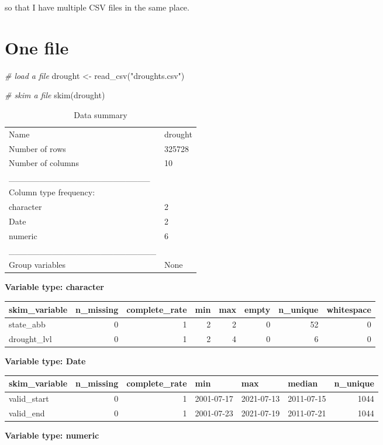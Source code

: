 \documentclass[
]{article}
\newenvironment{Shaded}{\begin{snugshade}}{\end{snugshade}}
\newcommand{\CommentTok}[1]{\textcolor[rgb]{0.56,0.35,0.01}{\textit{#1}}}
\newcommand{\FunctionTok}[1]{\textcolor[rgb]{0.00,0.00,0.00}{#1}}
\newcommand{\NormalTok}[1]{#1}
\newcommand{\OtherTok}[1]{\textcolor[rgb]{0.56,0.35,0.01}{#1}}
\newcommand{\StringTok}[1]{\textcolor[rgb]{0.31,0.60,0.02}{#1}}
\begin{document}
so that I have multiple CSV files in the same place.

\hypertarget{one-file}{%
\section{One file}\label{one-file}}

\begin{Shaded}
\begin{Highlighting}[]
\CommentTok{\# load a file}
\NormalTok{drought }\OtherTok{\textless{}{-}} \FunctionTok{read\_csv}\NormalTok{(}\StringTok{"droughts.csv"}\NormalTok{)}

\CommentTok{\# skim a file}
\FunctionTok{skim}\NormalTok{(drought)}
\end{Highlighting}
\end{Shaded}

\begin{longtable}[]{@{}ll@{}}
\caption{Data summary}\tabularnewline
\toprule
\endhead
Name & drought\tabularnewline
Number of rows & 325728\tabularnewline
Number of columns & 10\tabularnewline
\_\_\_\_\_\_\_\_\_\_\_\_\_\_\_\_\_\_\_\_\_\_\_ &\tabularnewline
Column type frequency: &\tabularnewline
character & 2\tabularnewline
Date & 2\tabularnewline
numeric & 6\tabularnewline
\_\_\_\_\_\_\_\_\_\_\_\_\_\_\_\_\_\_\_\_\_\_\_\_ &\tabularnewline
Group variables & None\tabularnewline
\bottomrule
\end{longtable}

\textbf{Variable type: character}

\begin{longtable}[]{@{}lrrrrrrr@{}}
\toprule
skim\_variable & n\_missing & complete\_rate & min & max & empty &
n\_unique & whitespace\tabularnewline
\midrule
\endhead
state\_abb & 0 & 1 & 2 & 2 & 0 & 52 & 0\tabularnewline
drought\_lvl & 0 & 1 & 2 & 4 & 0 & 6 & 0\tabularnewline
\bottomrule
\end{longtable}

\textbf{Variable type: Date}

\begin{longtable}[]{@{}lrrlllr@{}}
\toprule
skim\_variable & n\_missing & complete\_rate & min & max & median &
n\_unique\tabularnewline
\midrule
\endhead
valid\_start & 0 & 1 & 2001-07-17 & 2021-07-13 & 2011-07-15 &
1044\tabularnewline
valid\_end & 0 & 1 & 2001-07-23 & 2021-07-19 & 2011-07-21 &
1044\tabularnewline
\bottomrule
\end{longtable}

\textbf{Variable type: numeric}
\end{document}
